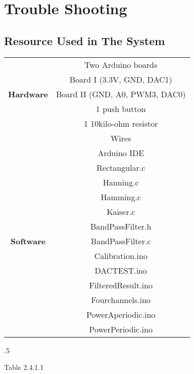 \documentclass[12pt]{report}
\begin{document}
\section{Trouble Shooting}
\subsection{Resource Used in The System}
\begin{center}
    \begin{tabular}{||c|c||} \hline
      \ & Two Arduino boards\\ & Board I (3.3V, GND, DAC1)\\ \textbf{Hardware} & Board II (GND, A0, PWM3, DAC0)\\ & 1 push button\\ &
      1 10kilo-ohm resistor\\ & Wires\\ \hline
      \ & Arduino IDE\\ & Rectangular.c\\ & Hanning.c\\ & Hamming.c\\ & Kaiser.c\\ & BandPassFilter.h\\ \textbf{Software} & BandPassFilter.c\\ & Calibration.ino\\ & DACTEST.ino\\ & FilteredResult.ino\\ & Fourchannels.ino\\ & PowerAperiodic.ino\\ & PowerPeriodic.ino\\ \hline
    \end{tabular}
  \end{center}
  \moveleft.5\hoffset\centerline{\footnotesize Table 2.4.1.1}
\end{document}
